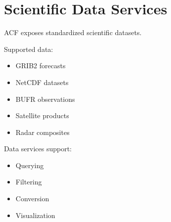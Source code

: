 \section{Scientific Data Services}


ACF exposes standardized scientific datasets.



Supported data:


\begin{itemize}

\item GRIB2 forecasts

\item NetCDF datasets

\item BUFR observations

\item Satellite products

\item Radar composites

\end{itemize}



Data services support:


\begin{itemize}

\item Querying

\item Filtering

\item Conversion

\item Visualization

\end{itemize}

